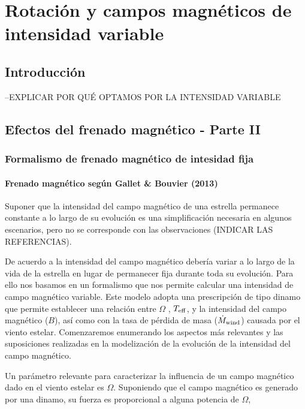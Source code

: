 \chapter{Rotación y campos magnéticos de intensidad variable}\label{ch:sexto-capitulo}

\section{Introducción}
--EXPLICAR POR QUÉ OPTAMOS POR LA INTENSIDAD VARIABLE

\section{Efectos del frenado magnético - Parte II}

\subsection{Formalismo de frenado magnético de intesidad fija} 

\subsubsection{Frenado magnético según Gallet \& Bouvier (2013)}
Suponer que la intensidad del campo magnético de una estrella permanece constante a lo largo de su evolución es una simplificación necesaria en algunos escenarios, pero no se corresponde con las observaciones (INDICAR LAS REFERENCIAS). \par

De acuerdo a \cite{Gallet2013} la intensidad del campo magnético debería variar a lo largo de la vida de la estrella en lugar de permanecer fija durante toda su evolución. Para ello nos basamos en un formalismo que nos permite calcular una intensidad de campo magnético variable. Este modelo adopta una prescripción de tipo dinamo que permite establecer una relación entre $\Omega$ , $T_{\mathrm{eff}}$, y la intensidad del campo magnético ($B$), así como con la tasa de pérdida de masa ($\Dot{M}_{\mathrm{wind}}$) causada por el viento estelar. Comenzaremos enumerando los aspectos más relevantes y las suposiciones realizadas en la modelización de la evolución de la intensidad del campo magnético.\par 

Un parámetro relevante para caracterizar la influencia de un campo magnético dado en el viento estelar es $\Omega$. Suponiendo que el campo magnético es generado por una dinamo, su fuerza es proporcional a alguna potencia de $\Omega$,

